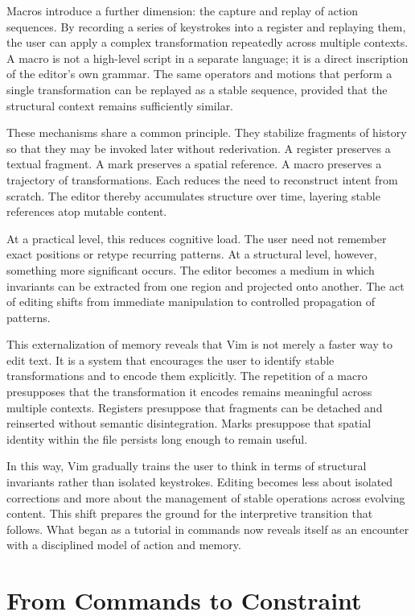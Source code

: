 \documentclass[12pt]{article}
\begin{document}
Macros introduce a further dimension: the capture and replay of action sequences. By recording a series of keystrokes into a register and replaying them, the user can apply a complex transformation repeatedly across multiple contexts. A macro is not a high-level script in a separate language; it is a direct inscription of the editor’s own grammar. The same operators and motions that perform a single transformation can be replayed as a stable sequence, provided that the structural context remains sufficiently similar.

These mechanisms share a common principle. They stabilize fragments of history so that they may be invoked later without rederivation. A register preserves a textual fragment. A mark preserves a spatial reference. A macro preserves a trajectory of transformations. Each reduces the need to reconstruct intent from scratch. The editor thereby accumulates structure over time, layering stable references atop mutable content.

At a practical level, this reduces cognitive load. The user need not remember exact positions or retype recurring patterns. At a structural level, however, something more significant occurs. The editor becomes a medium in which invariants can be extracted from one region and projected onto another. The act of editing shifts from immediate manipulation to controlled propagation of patterns.

This externalization of memory reveals that Vim is not merely a faster way to edit text. It is a system that encourages the user to identify stable transformations and to encode them explicitly. The repetition of a macro presupposes that the transformation it encodes remains meaningful across multiple contexts. Registers presuppose that fragments can be detached and reinserted without semantic disintegration. Marks presuppose that spatial identity within the file persists long enough to remain useful.

In this way, Vim gradually trains the user to think in terms of structural invariants rather than isolated keystrokes. Editing becomes less about isolated corrections and more about the management of stable operations across evolving content. This shift prepares the ground for the interpretive transition that follows. What began as a tutorial in commands now reveals itself as an encounter with a disciplined model of action and memory.

\section{From Commands to Constraint}
\end{document}
